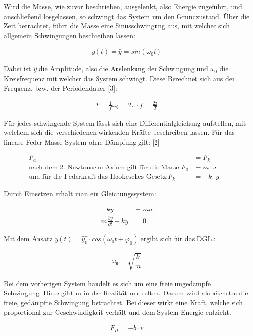 \documentclass[a4paper]{scrartcl}
\numberwithin{equation}{subsection}
\begin{document}
Wird die Masse, wie zuvor beschrieben, ausgelenkt, also Energie zugeführt, und anschließend losgelassen, so schwingt das System um den Grundzustand. 
Über die Zeit betrachtet, führt die Masse eine Sinusschwingung aus, mit welcher sich allgemein Schwingungen beschreiben lassen:

\begin{align}
y(t) = \widehat{y} = sin(\omega_0 t )
\end{align}


Dabei ist $\widehat{y}$ die Amplitude, also die Auslenkung der Schwingung und $\omega_0$ die Kreisfrequenz mit welcher das System schwingt. 
Diese Berechnet sich aus der Frequenz, bzw. der Periodendauer [3]:

\begin{align}
T = \frac{1}{f}
\omega_0 = 2\pi \cdot f = \frac{2\pi}{T}
\end{align}

Für jedes schwingende System lässt sich eine Differentialgleichung aufstellen, mit welchem sich die verschiedenen wirkenden Kräfte beschreiben lassen. Für das lineare Feder-Masse-System ohne Dämpfung gilt: [2]

\begin{align}
F_a &= F_k &\\
\text{nach dem 2. Newtonsche Axiom gilt für die Masse:} F_a &= m \cdot a &\\
\text{und für die Federkraft das Hookesches Gesetz:} F_k &= -k \cdot y &
\end{align}

Durch Einsetzen erhält man ein Gleichungssystem:

\begin{align}
-ky &= ma \\
m \frac{\partial y}{\partial t} + ky &= 0
\end{align}

Mit dem Ansatz $y(t) = \widehat{y_0} \cdot cos(\omega_0 t + \varphi_0)$ ergibt sich für das DGL.:

\begin{align}
\omega_0 = \sqrt{\dfrac{k}{m}}
\end{align}

Bei dem vorherigen System handelt es sich um eine freie ungedämpfe Schwingung. Diese gibt es in der Realität nur selten. Darum wird als nächstes die freie, gedämpfte Schwingung betrachtet.
Bei dieser wirkt eine Kraft, welche sich proportional zur Geschwindigkeit verhält und dem System Energie entzieht.

\begin{align}
F_D = -b \cdot v
\end{align}
\end{document}
